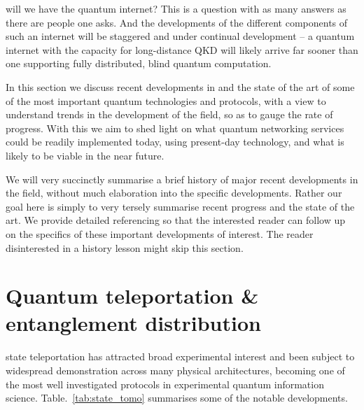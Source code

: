 %
%

\startnormtable

 will we have the quantum internet? This is a question with as many answers as there are people one asks. And the developments of the different components of such an internet will be staggered and under continual development -- a quantum internet with the capacity for long-distance QKD will likely arrive far sooner than one supporting fully distributed, blind quantum computation.

In this section we discuss recent developments in and the state of the art of some of the most important quantum technologies and protocols, with a view to understand trends in the development of the field, so as to gauge the rate of progress. With this we aim to shed light on what quantum networking services could be readily implemented today, using present-day technology, and what is likely to be viable in the near future.

We will very succinctly summarise a brief history of major recent developments in the field, without much elaboration into the specific developments. Rather our goal here is simply to very tersely summarise recent progress and the state of the art. We provide detailed referencing so that the interested reader can follow up on the specifics of these important developments of interest. The reader disinterested in a history lesson might skip this section.

%
%

\section{Quantum teleportation \& entanglement distribution}   

 state teleportation has attracted broad experimental interest and been subject to widespread demonstration across many physical architectures, becoming one of the most well investigated protocols in experimental quantum information science. Table.~\ref{tab:state_tomo} summarises some of the notable developments.

